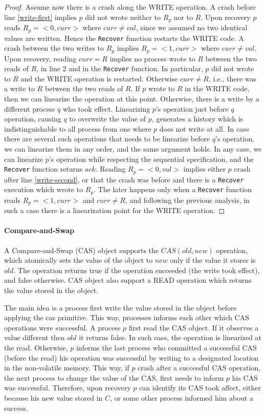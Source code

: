 \begin{proof}
	Assume now there is a crash along the WRITE operation. 
	A crash before line \ref{write-first} implies $p$ did not wrote neither to $R_p$ nor to $R$. Upon recovery $p$ reads $R_p=<0,curr>$ where $curr \neq val$, since we assumed no two identical values are written. Hence the \texttt{Recover} function restarts the WRITE code.
	A crash between the two writes to $R_p$ implies $R_p=<1,curr>$ where $curr \neq val$. Upon recovery, reading $curr = R$ implies no process wrote to $R$ between the two reads of $R$, in line 2 and in the \texttt{Recover} function. In particular, $p$ did not wrote to $R$ and the WRITE operation is restarted. Otherwise $curr \neq R$, i.e., there was a write to $R$ between the two reads of $R$. If $p$ wrote to $R$ in the WRITE code, then we can linearize the operation at this point. Otherwise, there is a write by a different process $q$ who took effect. Linearizing $p$'s operation just before $q$ operation, causing $q$ to overwrite the value of $p$, generates a history which is indistinguishable to all process from one where $p$ does not write at all. In case there are several such operations that needs to be linearize before $q$'s operation, we can linearize them in any order, and the same argument holds. In any case, we can linearize $p$'s operation while respecting the sequential specification, and the \texttt{Recover} function returns $ack$.
	Reading $R_p = <0,val>$ implies either $p$ crash after line \ref{write-second}, or that the crash was before and there is a \texttt{Recover} execution which wrote to $R_p$. The later happens only when a \texttt{Recover} function reads $R_p=<1,curr>$ and $curr \neq R$, and following the previous analysis, in such a case there is a linearization point for the WRITE operation.
\end{proof}


\paragraph*{Compare-and-Swap}

A Compare-and-Swap (CAS) object supports the $CAS(old,new)$ operation, which atomically sets the value of the object to $new$ only if the value it stores is $old$. The operation returns true if the operation succeeded (the write took effect), and false otherwise. CAS object also support a READ operation which returns the value stored in the object.

The main idea is a process first write the value stored in the object before applying the cas primitive. This way, processes informs each other which CAS operations were successful.
A process $p$ first read the CAS object. If it observes a value different then $old$ it returns false. In such case, the operation is linearized at the read. Otherwise, $p$ informs the last process who committed a successful CAS (before the read) his operation was successful by writing to a designated location in the non-volatile memory. This way, if $p$ crash after a successful CAS operation, the next process to change the value of the CAS, first needs to inform $p$ his CAS was successful. Therefore, upon recovery $p$ can identify its CAS took affect, either because his new value stored in $C$, or some other process informed him about a success.

